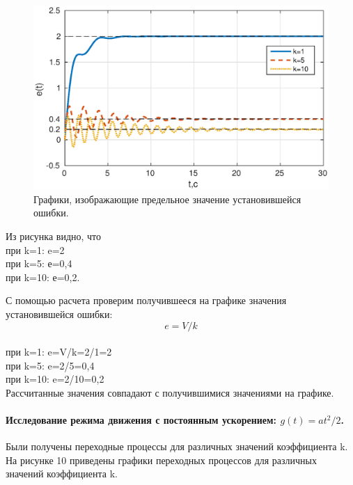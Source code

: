 \documentclass[a4paper,14pt]{article}
\begin{document}
\begin{figure}[H]
\centering
\includegraphics[width=\textwidth]{1/2_2e(t).eps}
\caption{Графики, изображающие предельное значение установившейся ошибки.}
\end{figure}

Из рисунка видно, что 
\\при k=1:  e=2
\\при k=5: е=0,4
\\при k=10: е=0,2.

С помощью расчета проверим получившееся на графике значения установившейся ошибки:
\begin{equation}
e=V/k
\end{equation}
\\при k=1: e=V/k=2/1=2
\\при k=5: e=2/5=0,4
\\при k=10: e=2/10=0,2
\\Рассчитанные значения совпадают с получившимися значениями на графике.

\paragraph{Исследование режима движения с постоянным ускорением: $g(t)=at^2/2$.}
Были получены переходные процессы для различных значений коэффициента  k.
\\На рисунке 10 приведены графики переходных процессов  для различных значений коэффициента  k.
\end{document}
